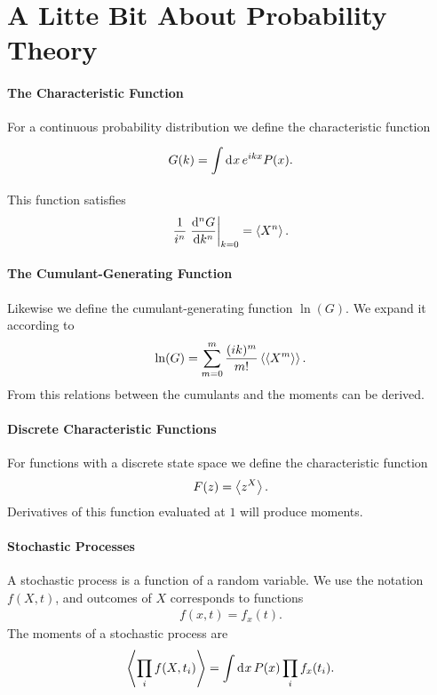 \section{A Litte Bit About Probability Theory}

\paragraph{The Characteristic Function}
For a continuous probability distribution we define the characteristic function
\begin{align*}
	G(k) = \int\limits_{}^{}\dd[]{x}e^{ikx}P(x).
\end{align*}
This function satisfies
\begin{align*}
	\frac{1}{i^{n}}\eval{\dv[n]{G}{k}}_{k = 0} = \expval{X^{n}}.
\end{align*}

\paragraph{The Cumulant-Generating Function}
Likewise we define the cumulant-generating function $\ln(G)$. We expand it according to
\begin{align*}
	\ln(G) = \sum\limits_{m = 0}^{m}\frac{(ik)^{m}}{m!}\expval{\expval{X^{m}}}.
\end{align*}
From this relations between the cumulants and the moments can be derived.

\paragraph{Discrete Characteristic Functions}
For functions with a discrete state space we define the characteristic function
\begin{align*}
	F(z) = \expval{z^{X}}.
\end{align*}
Derivatives of this function evaluated at $1$ will produce moments.

\paragraph{Stochastic Processes}
A stochastic process is a function of a random variable. We use the notation $f(X, t)$, and outcomes of $X$ corresponds to functions
\begin{align*}
	f(x, t) = f_{x}(t).
\end{align*}
The moments of a stochastic process are
\begin{align*}
	\expval{\prod\limits_{i}f(X, t_{i})} = \int\limits_{}^{}\dd[]{x}P(x)\prod\limits_{i}f_{x}(t_{i}).
\end{align*}

